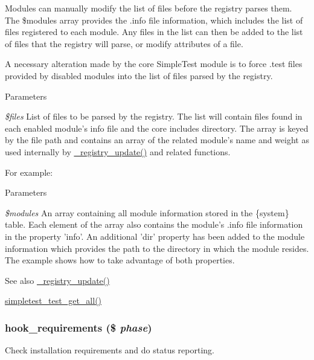 Modules can manually modify the list of files before the registry parses them. The \$modules array provides the .info file information, which includes the list of files registered to each module. Any files in the list can then be added to the list of files that the registry will parse, or modify attributes of a file.

A necessary alteration made by the core SimpleTest module is to force .test files provided by disabled modules into the list of files parsed by the registry.


\begin{DoxyParams}{Parameters}
\item[{\em \$files}]List of files to be parsed by the registry. The list will contain files found in each enabled module's info file and the core includes directory. The array is keyed by the file path and contains an array of the related module's name and weight as used internally by \hyperlink{group__registry_ga5008c77b133d55af7f1f4442d9e51167}{\_\-registry\_\-update()} and related functions.\end{DoxyParams}
For example: 
 
\begin{DoxyParams}{Parameters}
\item[{\em \$modules}]An array containing all module information stored in the \{system\} table. Each element of the array also contains the module's .info file information in the property 'info'. An additional 'dir' property has been added to the module information which provides the path to the directory in which the module resides. The example shows how to take advantage of both properties.\end{DoxyParams}
\begin{DoxySeeAlso}{See also}
\hyperlink{group__registry_ga5008c77b133d55af7f1f4442d9e51167}{\_\-registry\_\-update()} 

\hyperlink{simpletest_8module_a2d7610898fc04f0e9fa9a750d98f1513}{simpletest\_\-test\_\-get\_\-all()} 
\end{DoxySeeAlso}
\hypertarget{group__hooks_ga3cff06c700ccb873cfce71fc378e7675}{
\subsubsection[{hook\_\-requirements}]{\setlength{\rightskip}{0pt plus 5cm}hook\_\-requirements (\$ {\em phase})}}
\label{group__hooks_ga3cff06c700ccb873cfce71fc378e7675}
Check installation requirements and do status reporting.

